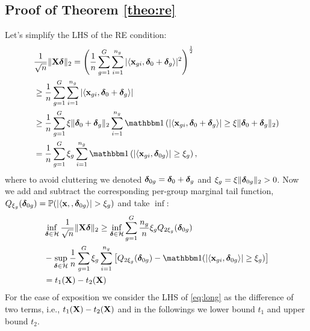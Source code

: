\subsection{Proof of Theorem \ref{theo:re}}
Let's simplify the LHS of the RE condition:%
{\small\begin{align}
\nr 
&\frac{1}{\sqrt{n}} \norm{\X \ddelta}{2} 
= \left(\frac{1}{n} \sum_{g=1}^{G} \sum_{i=1}^{n_g} |\langle \x_{gi}, \ddelta_0 + \ddelta_g \rangle|^2\right)^{\frac{1}{2}}
\\ \nr
&\geq \frac{1}{n} \sum_{g=1}^{G} \sum_{i=1}^{n_g} |\langle \x_{gi}, \ddelta_0 + \ddelta_g \rangle| 
\\ \nr 
&\geq \frac{1}{{n}} \sum_{g=1}^{G} \xi\norm{\ddelta_0+\ddelta_g}{2}  \sum_{i=1}^{n_g} \indic \left(|\langle \x_{gi}, \ddelta_0 + \ddelta_g \rangle| \geq \xi\norm{\ddelta_0+\ddelta_g}{2}\right)
\\ \nr 
&= \frac{1}{{n}} \sum_{g=1}^{G} \xi_g  \sum_{i=1}^{n_g} \indic \left(|\langle \x_{gi}, \ddelta_{0g} \rangle| \geq \xi_g\right),
\end{align}}
where to avoid cluttering we denoted $\boldsymbol{\delta}_{0g} = \boldsymbol{\delta}_0 + \boldsymbol{\delta}_g$ and $\xi_g = \xi \|\boldsymbol{\delta}_{0g}\|_{2} > 0$.
Now we add and subtract the corresponding per-group marginal tail function, $Q_{\xi_g}(\boldsymbol{\delta}_{0g}) = \mathbb{P}(|\langle \mathbf{x}, , \boldsymbol{\delta}_{0g} \rangle| > \xi_g)$ and take $\inf$: 
\begin{align}
\nr
&\inf_{\ddelta \in \cH} \frac{1}{\sqrt{n}} \norm{\X \ddelta}{2}
\geq \inf_{\ddelta\in \cH}\sum_{g=1}^{G}  \frac{n_g}{n}  \xi_g  Q_{2 \xi_g}(\ddelta_{0g}) 
\\ \nr 
&-	\sup_{\ddelta\in \cH} \frac{1}{n} \sum_{g=1}^{G}  \xi_g  \sum_{i=1}^{n_g} \left[Q_{2 \xi_g}(\ddelta_{0g})  
- \indic (|\langle \x_{gi}, \ddelta_{0g} \rangle| \geq   \xi_g)  \right]
\\ \label{eq:long}
&= t_1(\X)-t_2(\X) 
\end{align}
For the ease of exposition we consider the LHS of \eqref{eq:long}  as the difference of two terms, i.e., $t_1(\mathbf{X}) - t_2(\mathbf{X})$ and in the followings we lower bound $t_1$ and upper bound $t_2$. 

